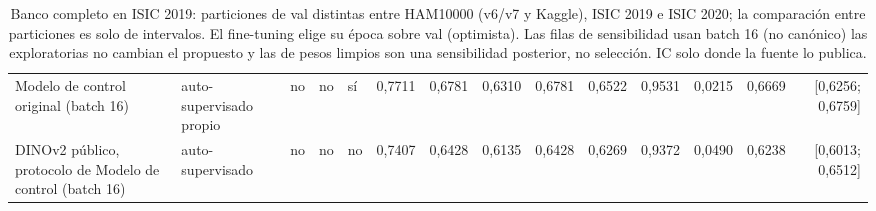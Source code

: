 \begin{table}[ht]
\begin{tabular}{@{}lllllrrrrrrrrr@{}}
Modelo de control original (batch 16) & auto-supervisado propio & no & no & sí & 0,7711 & 0,6781 & 0,6310 & 0,6781 & 0,6522 & 0,9531 & 0,0215 & 0,6669 & [0,6256; 0,6759] \\
DINOv2 público, protocolo de Modelo de control (batch 16) & auto-supervisado & no & no & no & 0,7407 & 0,6428 & 0,6135 & 0,6428 & 0,6269 & 0,9372 & 0,0490 & 0,6238 & [0,6013; 0,6512] \\
\bottomrule
\end{tabular}
\caption{Banco completo en ISIC 2019: particiones de val distintas entre HAM10000 (v6/v7 y Kaggle), ISIC 2019 e ISIC 2020; la comparación entre particiones es solo de intervalos. El fine-tuning elige su época sobre val (optimista). Las filas de sensibilidad usan batch 16 (no canónico) las exploratorias no cambian el propuesto y las de pesos limpios son una sensibilidad posterior, no selección. IC solo donde la fuente lo publica.}
\label{tab:bench-isic2019}
\end{table}

